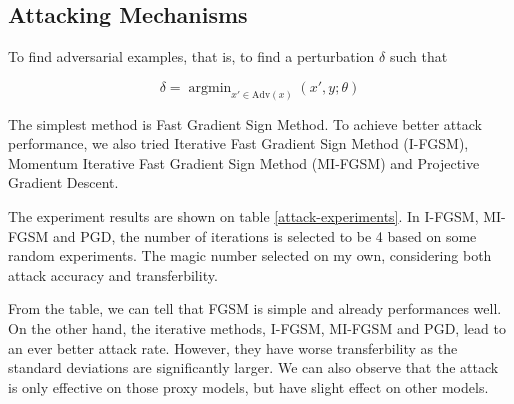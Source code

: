 \documentclass{article}
\begin{document}
\subsection{Attacking Mechanisms}

To find adversarial examples\cite{chen2020spml}, that is, to find a perturbation $\delta$ such that

\begin{equation}
  \delta = \mathop{\arg\min}_{x' \in \mathrm{Adv}(x)} (x', y; \theta)
\end{equation}

The simplest method is Fast Gradient Sign Method\cite{goodfellow2014explaining}. To achieve better attack performance, we also tried Iterative Fast Gradient Sign Method (I-FGSM)\cite{kurakin2016adversarial}, Momentum Iterative Fast Gradient Sign Method (MI-FGSM)\cite{dong2018boosting} and Projective Gradient Descent\cite{madry2017towards}.

The experiment results are shown on table \ref{attack-experiments}. In I-FGSM, MI-FGSM and PGD, the number of iterations is selected to be 4 based on some random experiments. The magic number selected on my own, considering both attack accuracy and transferbility.

From the table, we can tell that FGSM is simple and already performances well. On the other hand, the iterative methods, I-FGSM, MI-FGSM and PGD, lead to an ever better attack rate. However, they have worse transferbility as the standard deviations are significantly larger. We can also observe that the attack is only effective on those proxy models, but have slight effect on other models.
\end{document}
